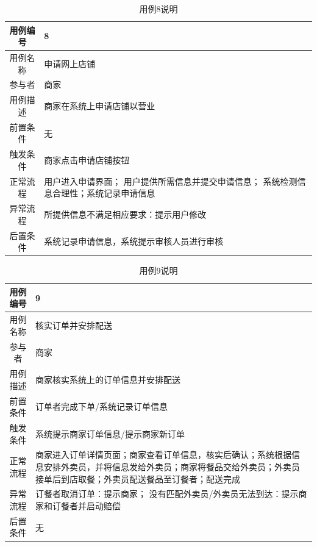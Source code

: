 \documentclass{article}
\begin{document}
    \begin{table}[H]
        \centering
        \caption{用例8说明}
        \begin{tabular}{cm{12cm}}
            \hline
            用例编号 & 8 \\
            \hline
            用例名称 & 申请网上店铺 \\
            \hline
            参与者 & 商家 \\
            \hline
            用例描述 & 商家在系统上申请店铺以营业 \\
            \hline
            前置条件 & 无 \\
            \hline
            触发条件 & 商家点击申请店铺按钮 \\
            \hline
            正常流程 & 用户进入申请界面； 用户提供所需信息并提交申请信息； 系统检测信息合理性；系统记录申请信息 \\
            \hline
            异常流程 & 所提供信息不满足相应要求：提示用户修改 \\
            \hline
            后置条件 & 系统记录申请信息，系统提示审核人员进行审核 \\
            \hline
        \end{tabular}
    \end{table}
    \begin{table}[H]
        \centering
        \caption{用例9说明}
        \begin{tabular}{cm{12cm}}
            \hline
            用例编号 & 9 \\
            \hline
            用例名称 & 核实订单并安排配送 \\
            \hline
            参与者 & 商家 \\
            \hline
            用例描述 & 商家核实系统上的订单信息并安排配送 \\
            \hline
            前置条件 & 订单者完成下单/系统记录订单信息 \\
            \hline
            触发条件 & 系统提示商家订单信息/提示商家新订单 \\
            \hline
            正常流程 & 商家进入订单详情页面；商家查看订单信息，核实后确认；系统根据信息安排外卖员，并将信息发给外卖员；商家将餐品交给外卖员；外卖员接单后到店取餐；外卖员配送餐品至订餐者；配送完成 \\
            \hline
            异常流程 & 订餐者取消订单：提示商家； 没有匹配外卖员/外卖员无法到达：提示商家和订餐者并启动赔偿 \\
            \hline
            后置条件 & 无 \\
            \hline
        \end{tabular}
    \end{table}
\end{document}

